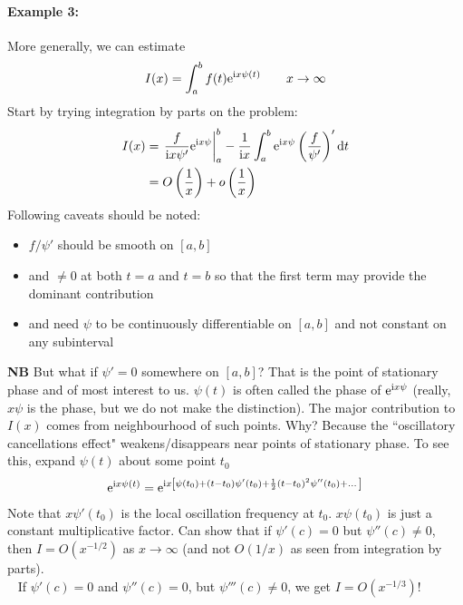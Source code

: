 \paragraph{Example 3:} More generally, we can estimate
\begin{gather*}
	I(x) = \int_{a}^{b} f(t) \mathrm{e}^{\mathrm{i} x \psi(t)} \qquad x \rightarrow \infty
\end{gather*} 
Start by trying integration by parts on the problem:
\begin{align*}
	I(x) &= \left.\frac{f}{\mathrm{i} x \psi '} \mathrm{e}^{\mathrm{i} x \psi} \right|^b_a - \frac{1}{\mathrm{i} x} \int_{a}^{b} \mathrm{e}^{\mathrm{i} x \psi } \left(\frac{f}{\psi'}\right)' \mathrm{d} t \\
	&= O\left(\frac{1}{x}\right) + o\left(\frac{1}{x}\right)
\end{align*}
Following caveats should be noted:
\begin{itemize}
	\item $f/\psi'$ should be smooth on $[a,b]$ 
	\item and $\neq 0$ at both $t=a$ and $t=b$ so that the first term may provide the dominant contribution
	\item and need $\psi$ to be continuously differentiable on $[a,b]$ and not constant on any subinterval 
\end{itemize}
{\bf NB} But what if $\psi'=0$ somewhere on $[a,b]$? That is the point of stationary phase and of most interest to us. $\psi(t)$ is often called the phase of $\mathrm{e}^{\mathrm{i} x \psi}$ (really, $x\psi$ is the phase, but we do not make the distinction). The major contribution to $I(x)$ comes from neighbourhood of such points. Why? Because the ``oscillatory cancellations effect" weakens/disappears near points of stationary phase. To see this, expand $\psi(t)$ about some point $t_0$
\begin{align*}
	\mathrm{e}^{\mathrm{i} x \psi(t)} = \mathrm{e}^{\mathrm{i} x \left[\psi(t_0) + (t-t_0) \psi'(t_0) + \frac{1}{2}(t-t_0)^2 \psi''(t_0) + \dots\right]} 
\end{align*}
Note that $x\psi'(t_0)$ is the local oscillation frequency at $t_0$. $x \psi(t_0)$ is just a constant multiplicative factor. Can show that if $\psi'(c)=0$ but $\psi''(c) \neq 0$, then $I = O(x^{-1/2})$ as $x \rightarrow \infty$ (and not $O(1/x)$ as seen from integration by parts). \\
\ \newline
If $\psi'(c)=0$ and $\psi''(c)=0$, but $\psi'''(c) \neq 0$, we get $I = O(x^{-1/3})$!

